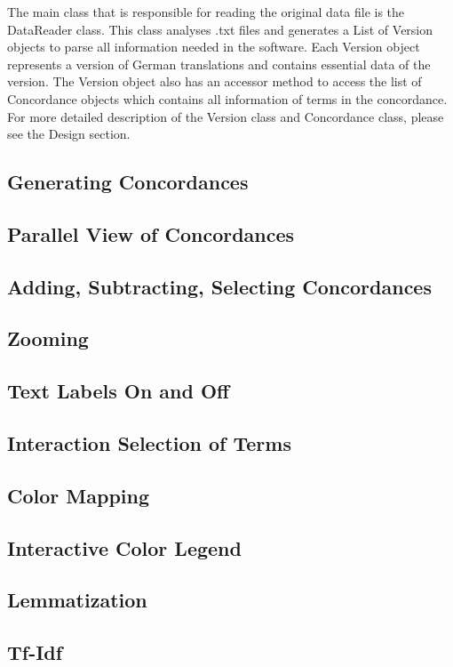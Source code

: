 The main class that is responsible for reading the original data file is the DataReader class. This class analyses .txt files and generates a List of Version objects to parse all information needed in the software. Each Version object represents a version of German translations and contains essential data of the version. The Version object also has an accessor method to access the list of Concordance objects which contains all information of terms in the concordance. For more detailed description of the Version class and Concordance class, please see the Design section.



\subsection{Generating Concordances}

\subsection{Parallel View of Concordances}

\subsection{Adding, Subtracting, Selecting Concordances}

\subsection{Zooming}

\subsection{Text Labels On and Off}

\subsection{Interaction Selection of Terms}

\subsection{Color Mapping}

\subsection{Interactive Color Legend}

\subsection{Lemmatization}

\subsection{Tf-Idf}

\subsection{}



